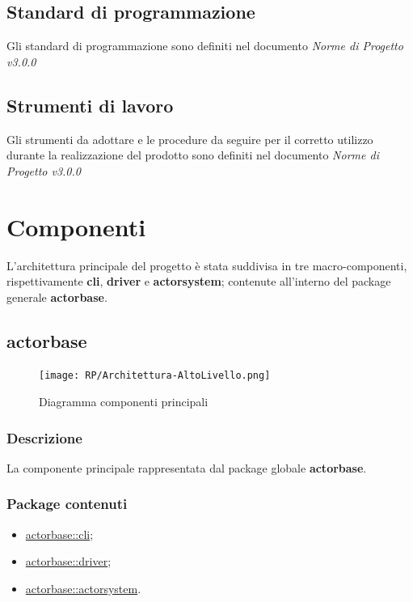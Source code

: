 \documentclass{scalatekids-article}
\begin{document}

\subsection{Standard di programmazione}
Gli standard di programmazione sono definiti nel documento \textit{Norme di Progetto v3.0.0}

\subsection{Strumenti di lavoro}
Gli strumenti da adottare e le procedure da seguire per il corretto utilizzo
durante la realizzazione del prodotto sono definiti nel documento \textit{Norme
di Progetto v3.0.0}

\section{Componenti}

L'architettura principale del progetto è stata suddivisa in tre macro-componenti, rispettivamente
\textbf{cli}, \textbf{driver} e \textbf{actorsystem}; contenute all'interno del package
generale \textbf{actorbase}.

\subsection{actorbase}
\label{sec:actorbase}

\begin{figure}[H]
  \begin{center}
    \texttt{[image: RP/Architettura-AltoLivello.png]}
    \caption{Diagramma componenti principali}
  \end{center}
\end{figure}

\subsubsection{Descrizione}

La componente principale rappresentata dal package globale \textbf{actorbase}.

\subsubsection{Package contenuti}

\begin{itemize}
\item \hyperref[sec:actorbase::cli]{actorbase::cli};
\item \hyperref[sec:actorbase::driver]{actorbase::driver};
\item \hyperref[sec:actorbase::actorsystem]{actorbase::actorsystem}.
\end{itemize}
\end{document}
